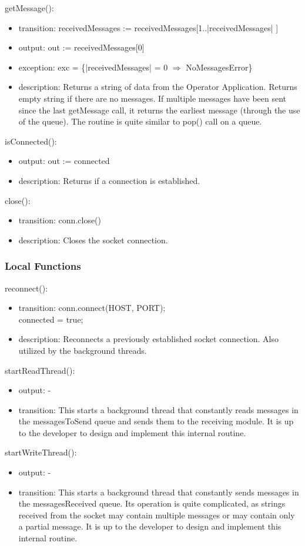 \documentclass[12pt, titlepage]{article}
\begin{document}
\noindent getMessage():
\begin{itemize}
\item transition: receivedMessages := receivedMessages[1..|receivedMessages| ]
\item output: out := receivedMessages[0]
\item exception: exc = \{|receivedMessages| = 0 $\Rightarrow$ NoMessagesError\}
\item description: Returns a string of data from the Operator Application. Returns empty string if there are no messages. If multiple messages have been sent since the last getMessage call, it returns the earliest message (through the use of the queue). The routine is quite similar to pop() call on a queue.
\end{itemize}
\noindent isConnected():
\begin{itemize}
\item output: out := connected
\item description: Returns if a connection is established.
\end{itemize}
\noindent close():
\begin{itemize}
\item transition: conn.close()
\item description: Closes the socket connection. 
\end{itemize}
\subsubsection{Local Functions}
\noindent reconnect():
\begin{itemize}
\item transition: conn.connect(HOST, PORT); \\ connected = true;
\item description: Reconnects a previously established socket connection. Also utilized by the background threads.
\end{itemize}
\noindent startReadThread():
\begin{itemize}
\item output: -
\item transition: This starts a background thread that constantly reads messages in the messagesToSend queue and sends them to the receiving module. It is up to the developer to design and implement this internal routine.
\end{itemize}
\noindent startWriteThread():
\begin{itemize}
\item output: -
\item transition: This starts a background thread that constantly sends messages in the  messagesReceived queue. Its operation is quite complicated, as strings received from the socket may contain multiple messages or may contain only a partial message. It is up to the developer to design and implement this internal routine.
\end{itemize}
\newpage
\end{document}

